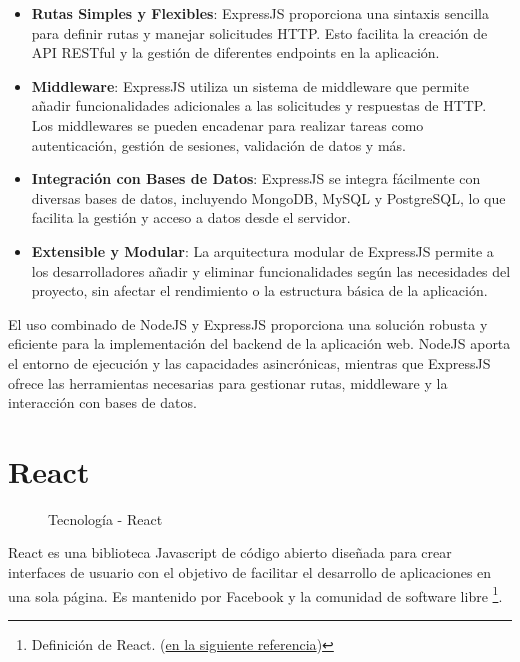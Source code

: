 \begin{itemize}

  \item \textbf{Rutas Simples y Flexibles}: ExpressJS proporciona una sintaxis sencilla para definir rutas y manejar solicitudes HTTP. Esto facilita la creación de API RESTful y la gestión de diferentes endpoints en la aplicación.
  
  \item \textbf{Middleware}: ExpressJS utiliza un sistema de middleware que permite añadir funcionalidades adicionales a las solicitudes y respuestas de HTTP. Los middlewares se pueden encadenar para realizar tareas como autenticación, gestión de sesiones, validación de datos y más.
  
  \item \textbf{Integración con Bases de Datos}: ExpressJS se integra fácilmente con diversas bases de datos, incluyendo MongoDB, MySQL y PostgreSQL, lo que facilita la gestión y acceso a datos desde el servidor.
  
  \item \textbf{Extensible y Modular}: La arquitectura modular de ExpressJS permite a los desarrolladores añadir y eliminar funcionalidades según las necesidades del proyecto, sin afectar el rendimiento o la estructura básica de la aplicación.
  
\end{itemize}

El uso combinado de NodeJS y ExpressJS proporciona una solución robusta y eficiente para la implementación del backend de la aplicación web. NodeJS aporta el entorno de ejecución y las capacidades asincrónicas, mientras que ExpressJS ofrece las herramientas necesarias para gestionar rutas, middleware y la interacción con bases de datos.

\newpage

\section{React}

\begin{figure}[h]
\centering
 \caption{Tecnología - React}
\end{figure}

React es una biblioteca Javascript de código abierto diseñada para crear interfaces de usuario con el objetivo de facilitar el desarrollo de aplicaciones en una sola página. Es mantenido por Facebook y la comunidad de software libre \footnote{Definición de React. (\href{https://es.wikipedia.org/wiki/React}{en la siguiente referencia})}. \\

